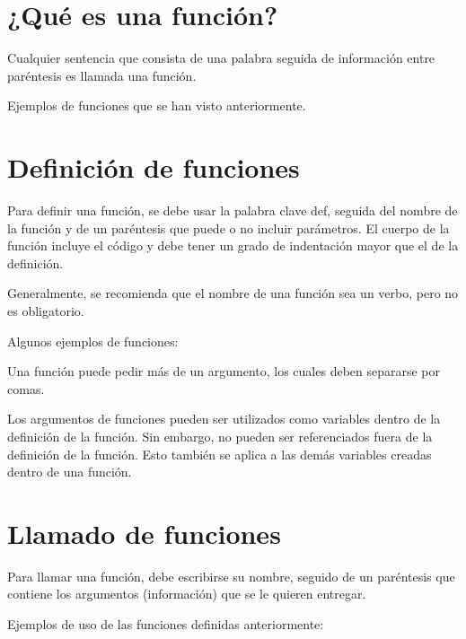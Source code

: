 \documentclass{report}
\begin{document}
\section{¿Qué es una función?}

Cualquier sentencia que consista de una palabra seguida de información entre paréntesis es llamada una función.\smallskip

Ejemplos de funciones que se han visto anteriormente.


\section{Definición de funciones}

Para definir una función, se debe usar la palabra clave def, seguida del nombre de la función y de un paréntesis que puede o no incluir parámetros. El cuerpo de la función incluye el código y debe tener un grado de indentación mayor que el de la definición.\smallskip

Generalmente, se recomienda que el nombre de una función sea un verbo, pero no es obligatorio.\smallskip

Algunos ejemplos de funciones:



Una función puede pedir más de un argumento, los cuales deben separarse por comas.



Los argumentos de funciones pueden ser utilizados como variables dentro de la definición de la función. Sin embargo, no pueden ser referenciados fuera de la definición de la función. Esto también se aplica a las demás variables creadas dentro de una función.

\section{Llamado de funciones}

Para llamar una función, debe escribirse su nombre, seguido de un paréntesis que contiene los argumentos (información) que se le quieren entregar.\smallskip

Ejemplos de uso de las funciones definidas anteriormente:
\end{document}
